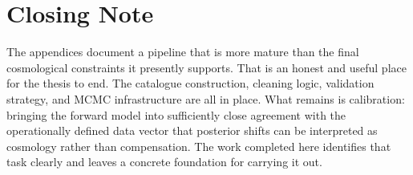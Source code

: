 \documentclass[12pt]{report}
\begin{document}
\chapter*{Closing Note}

The appendices document a pipeline that is more mature than the final cosmological constraints it presently supports. That is an honest and useful place for the thesis to end. The catalogue construction, cleaning logic, validation strategy, and MCMC infrastructure are all in place. What remains is calibration: bringing the forward model into sufficiently close agreement with the operationally defined data vector that posterior shifts can be interpreted as cosmology rather than compensation. The work completed here identifies that task clearly and leaves a concrete foundation for carrying it out.




\end{document}
